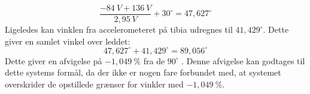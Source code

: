 \begin{equation}
\dfrac{-84~V+136~V}{2,95~V}+30^{\circ}=47,627^{\circ}
\end{equation}
Ligeledes kan vinklen fra accelerometeret på tibia udregnes til $41,429^{\circ}$. Dette giver en samlet vinkel over leddet: 
%
\begin{equation}
47,627^{\circ}+41,429^{\circ}=89,056^{\circ}
\end{equation}
Dette giver en afvigelse på $-1,049~\%$ fra de $90^{\circ}$	. Denne afvigelse kan godtages til dette systems formål, da der ikke er nogen fare forbundet med, at systemet overskrider de opstillede grænser for vinkler med $-1,049~\%$.









